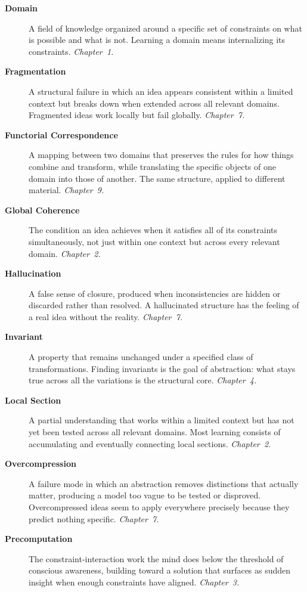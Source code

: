 \documentclass[11pt]{book}
\theoremstyle{definition}
\theoremstyle{remark}
\begin{document}
\begin{description}
\item[\textbf{Domain}] A field of knowledge organized around a specific
set of constraints on what is possible and what is not. Learning a
domain means internalizing its constraints. \textit{Chapter~1.}

\item[\textbf{Fragmentation}] A structural failure in which an idea
appears consistent within a limited context but breaks down when
extended across all relevant domains. Fragmented ideas work locally
but fail globally. \textit{Chapter~7.}

\item[\textbf{Functorial Correspondence}] A mapping between two domains
that preserves the rules for how things combine and transform, while
translating the specific objects of one domain into those of another.
The same structure, applied to different material. \textit{Chapter~9.}

\item[\textbf{Global Coherence}] The condition an idea achieves when
it satisfies all of its constraints simultaneously, not just within
one context but across every relevant domain. \textit{Chapter~2.}

\item[\textbf{Hallucination}] A false sense of closure, produced when
inconsistencies are hidden or discarded rather than resolved. A
hallucinated structure has the feeling of a real idea without the
reality. \textit{Chapter~7.}

\item[\textbf{Invariant}] A property that remains unchanged under a
specified class of transformations. Finding invariants is the goal of
abstraction: what stays true across all the variations is the
structural core. \textit{Chapter~4.}

\item[\textbf{Local Section}] A partial understanding that works within
a limited context but has not yet been tested across all relevant
domains. Most learning consists of accumulating and eventually
connecting local sections. \textit{Chapter~2.}

\item[\textbf{Overcompression}] A failure mode in which an abstraction
removes distinctions that actually matter, producing a model too vague
to be tested or disproved. Overcompressed ideas seem to apply
everywhere precisely because they predict nothing specific.
\textit{Chapter~7.}

\item[\textbf{Precomputation}] The constraint-interaction work the mind
does below the threshold of conscious awareness, building toward a
solution that surfaces as sudden insight when enough constraints have
aligned. \textit{Chapter~3.}


\end{description}
\end{document}
